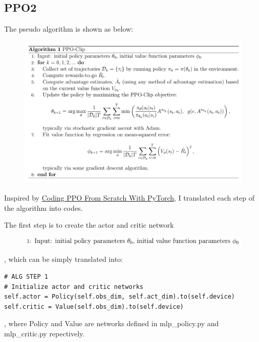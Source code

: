 \documentclass[UTF8, a4paper, 11pt]{article}
\begin{document}
\subsection{PPO2}
The pseudo algorithm is shown as below:
\begin{figure}[H]
    \centering
    \includegraphics[width = \textwidth]{PPO-Clip.png}
\end{figure}
Inspired by \href{https://medium.com/analytics-vidhya/coding-ppo-from-scratch-with-pytorch-part-1-4-613dfc1b14c8}{Coding PPO From Scratch With PyTorch}, I translated
each step of the algorithm into codes.

The first step is to create the actor and critic network
\begin{figure}[H]
    \centering
    \includegraphics[width = \textwidth]{step1.png}
\end{figure}
, which can be simply translated into:
\begin{lstlisting}
# ALG STEP 1
# Initialize actor and critic networks
self.actor = Policy(self.obs_dim, self.act_dim).to(self.device)
self.critic = Value(self.obs_dim).to(self.device)
\end{lstlisting}
, where Policy and Value are networks defined in mlp\_policy.py and mlp\_critic.py repectively.
\end{document}
